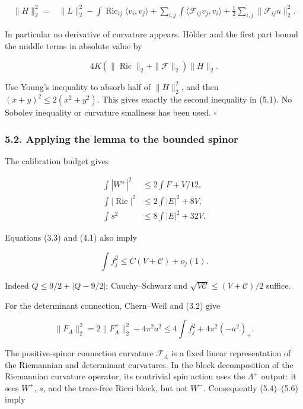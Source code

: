 \documentclass[
  10pt,
]{article}
\begin{document}
\[
 \begin{aligned}
 \|H\|_2^2={}&\|L\|_2^2
  -\int\operatorname{Ric}_{ij}\langle v_i,v_j\rangle
  +\sum_{i,j}\int\langle\mathscr F_{ij}v_j,v_i\rangle
  +\frac12\sum_{i,j}\|\mathscr F_{ij}u\|_2^2.
 \end{aligned}                                              \tag{5.3}
\]

In particular no derivative of curvature appears. Hölder and the first
part bound the middle terms in absolute value by

\[
   4K(\|\operatorname{Ric}\|_2+\|\mathscr F\|_2)\|H\|_2.
\]

Use Young's inequality to absorb half of \(\|H\|_2^2\), and then
\((x+y)^2\le2(x^2+y^2)\). This gives exactly the second inequality in
(5.1). No Sobolev inequality or curvature smallness has been used.
\(\square\)

\hypertarget{applying-the-lemma-to-the-bounded-spinor}{%
\subsubsection{5.2. Applying the lemma to the bounded
spinor}\label{applying-the-lemma-to-the-bounded-spinor}}

The calibration budget gives

\[
 \begin{aligned}
 \int|W^+|^2&\le2\int F+V/12,\\
 \int|\operatorname{Ric}|^2&\le2\int|E|^2+8V,\\
 \int s^2&\le8\int|E|^2+32V.
 \end{aligned}                                              \tag{5.4}
\]

Equations (3.3) and (4.1) also imply

\[
                         \int f_j^2\le C(V+\mathcal C)+o_j(1).
 \tag{5.5}
\]

Indeed \(Q\le9/2+|Q-9/2|\); Cauchy--Schwarz and
\(\sqrt{V\mathcal C}\le(V+\mathcal C)/2\) suffice.

For the determinant connection, Chern--Weil and (3.2) give

\[
 \|F_A\|_2^2
   =2\|F_A^+\|_2^2-4\pi^2a^2
   \le4\int f_j^2+4\pi^2(-a^2)_+.
 \tag{5.6}
\]

The positive-spinor connection curvature \(\mathscr F_A\) is a fixed
linear representation of the Riemannian and determinant curvatures. In
the block decomposition of the Riemannian curvature operator, its
nontrivial spin action uses the \(\Lambda^+\) output: it sees \(W^+\),
\(s\), and the trace-free Ricci block, but not \(W^-\). Consequently
(5.4)--(5.6) imply
\end{document}
